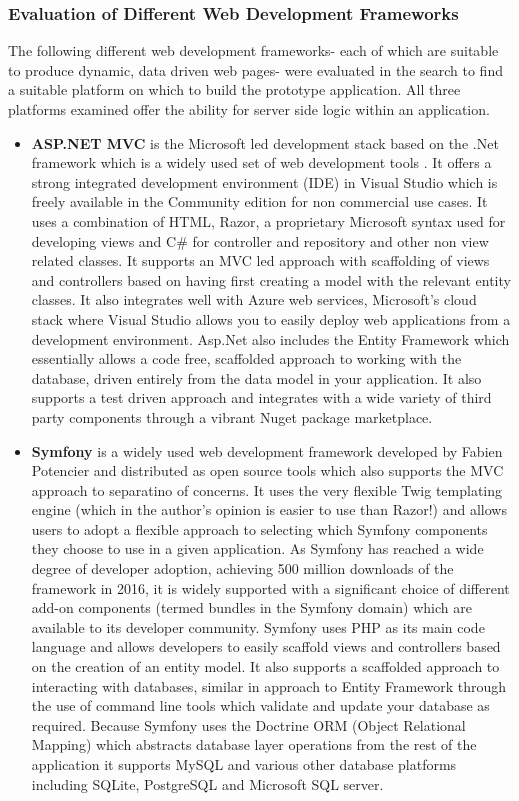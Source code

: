 \documentclass[a4paper,Times New Roman 11pt]{article}
\begin{document}
\subsubsection{Evaluation of Different Web Development Frameworks}
The following different web development frameworks- each of which are suitable to produce dynamic, data driven web pages- were evaluated in the search to find a suitable platform on which to build the prototype application. All three platforms examined offer the ability for server side logic within an application.
\begin{itemize}
\item \textbf{ASP.NET MVC} is the Microsoft led development stack based on the .Net framework which is a widely used set of web development tools . It offers a strong integrated development environment (IDE) in Visual Studio which is freely available in the Community edition for non commercial use cases. It uses a combination of HTML, Razor, a proprietary Microsoft syntax used for developing views and C\# for controller and repository and other non view related classes. It supports an MVC led approach with scaffolding of views and controllers based on having first creating a model with the relevant entity classes. It also integrates well with Azure web services, Microsoft's cloud stack where Visual Studio allows you to easily deploy web applications from a development environment. Asp.Net also includes the Entity Framework which essentially allows a code free, scaffolded approach to working with the database, driven entirely from the data model in your application. It also supports a test driven approach and integrates with a wide variety of third party components through a vibrant Nuget package marketplace.
\item \textbf{Symfony} is a widely used web development framework developed by Fabien Potencier and distributed as open source tools which also supports the MVC approach to separatino of concerns. It uses the very flexible Twig templating engine (which in the author's opinion is easier to use than Razor!) and allows users to adopt a flexible approach to selecting which Symfony components they choose to use in a given application. As Symfony has reached a wide degree of developer adoption, achieving 500 million downloads of the framework in 2016, it is widely supported with a significant choice of different add-on components (termed bundles in the Symfony domain) which are available to its developer community. Symfony uses PHP as its main code language and allows developers to easily scaffold views and controllers based on the creation of an entity model. It also supports a scaffolded approach to interacting with databases, similar in approach to Entity Framework through the use of command line tools which validate and update your database as required. Because Symfony uses the Doctrine ORM (Object Relational Mapping) which abstracts database layer operations from the rest of the application it supports MySQL and various other database platforms including SQLite, PostgreSQL and Microsoft SQL server.


\end{itemize}
\end{document}

